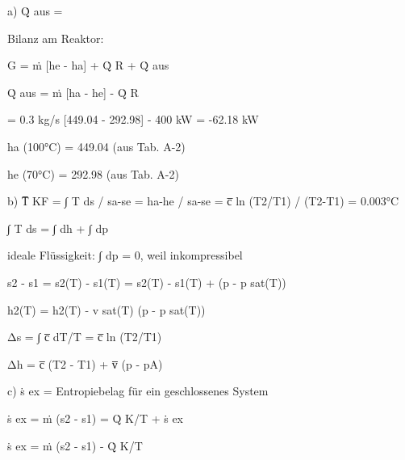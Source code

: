 a) Q̇ aus =

Bilanz am Reaktor:

G = ṁ [he - ha] + Q̇ R + Q̇ aus

Q̇ aus = ṁ [ha - he] - Q̇ R

= 0.3 kg/s [449.04 - 292.98] - 400 kW = -62.18 kW

ha (100°C) = 449.04 (aus Tab. A-2)

he (70°C) = 292.98 (aus Tab. A-2)

b) T̅ KF = ∫ T ds / sa-se = ha-he / sa-se = c̅ ln (T2/T1) / (T2-T1) = 0.003°C

∫ T ds = ∫ dh + ∫ dp

ideale Flüssigkeit: ∫ dp = 0, weil inkompressibel

s2 - s1 = s2(T) - s1(T) = s2(T) - s1(T) + (p - p sat(T))

h2(T) = h2(T) - v sat(T) (p - p sat(T))

Δs = ∫ c̅ dT/T = c̅ ln (T2/T1)

Δh = c̅ (T2 - T1) + v̅ (p - pA)

c) ṡ ex = Entropiebelag für ein geschlossenes System

ṡ ex = ṁ (s2 - s1) = Q̇ K/T + ṡ ex

ṡ ex = ṁ (s2 - s1) - Q̇ K/T